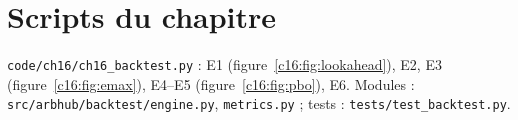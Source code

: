 \section{Scripts du chapitre}
\sloppy\noindent\texttt{code/ch16/ch16\_backtest.py} : E1 (figure~\ref{c16:fig:lookahead}), E2, E3 (figure~\ref{c16:fig:emax}), E4–E5 (figure~\ref{c16:fig:pbo}), E6. Modules : \texttt{src/arbhub/backtest/engine.py}, \texttt{metrics.py} ; tests : \texttt{tests/test\_backtest.py}.
